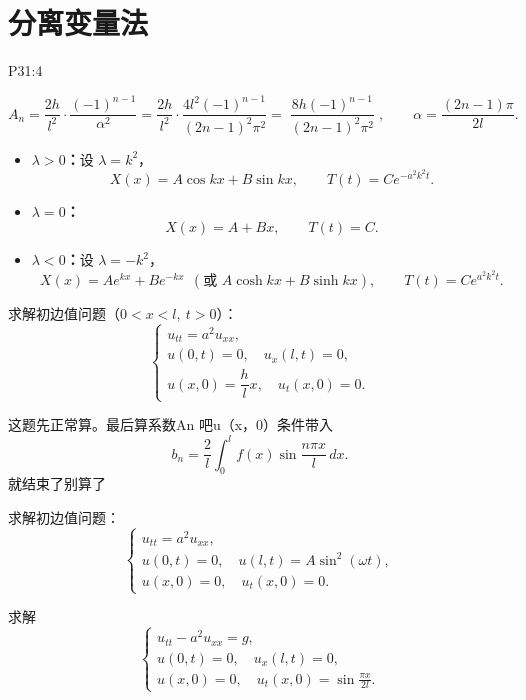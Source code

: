 \section{分离变量法}
P31:4
\begin{dxtips}
    \[
A_n=\frac{2h}{l^2}\cdot \frac{(-1)^{n-1}}{\alpha^{2}}
=\frac{2h}{l^2}\cdot \frac{4l^2(-1)^{n-1}}{(2n-1)^2\pi^2}
=\boxed{\;\frac{8h(-1)^{n-1}}{(2n-1)^2\pi^2}\;},
\qquad
\alpha=\frac{(2n-1)\pi}{2l}.
\]
\end{dxtips}
\begin{dxtips}
    \begin{itemize}
  \item \textbf{$\lambda>0$：}设 $\lambda=k^{2}$，
  \[
  X(x)=A\cos kx+B\sin kx,\qquad T(t)=C e^{-a^{2}k^{2}t}.
  \]

  \item \textbf{$\lambda=0$：}
  \[
  X(x)=A+Bx,\qquad T(t)=C.
  \]

  \item \textbf{$\lambda<0$：}设 $\lambda=-k^{2}$，
  \[
  X(x)=A e^{kx}+B e^{-kx}\ \ (\text{或 }A\cosh kx+B\sinh kx),\qquad
  T(t)=C e^{a^{2}k^{2}t}.
  \]
\end{itemize}
\end{dxtips}
\begin{homework}[1(2)]
求解初边值问题（$0<x<l,\ t>0$）：
\[
\begin{cases}
u_{tt}=a^{2}u_{xx},\\[3pt]
u(0,t)=0,\quad u_x(l,t)=0,\\[3pt]
u(x,0)=\dfrac{h}{l}x,\quad u_t(x,0)=0.
\end{cases}
\]
\end{homework}
\begin{dxtips}
    这题先正常算。最后算系数An
    吧u（x，0）条件带入$$b_n=\frac{2}{l}\int_{0}^{l} f(x)\sin\frac{n\pi x}{l}\,dx.$$就结束了别算了
\end{dxtips}
\begin{homework}[2]
求解初边值问题：
\[
\begin{cases}
u_{tt}=a^{2}u_{xx},\\[3pt]
u(0,t)=0,\quad u(l,t)=A\sin^{2}(\omega t),\\[3pt]
u(x,0)=0,\quad u_t(x,0)=0.
\end{cases}
\]
\end{homework}

\begin{homework}
[4]求解
\[
\begin{cases}
u_{tt}-a^{2}u_{xx}=g,\\[3pt]
u(0,t)=0,\quad u_x(l,t)=0,\\[3pt]
u(x,0)=0,\quad u_t(x,0)=\sin\frac{\pi x}{2l}.
\end{cases}
\]
\end{homework}

